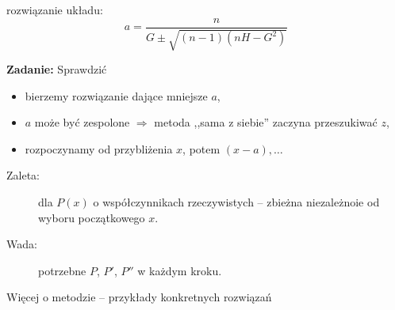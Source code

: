 \begin{frame}
  rozwiązanie układu: $$a = \frac{n}{G \pm \sqrt{(n-1)(nH-G^2)}}$$

  \textbf{Zadanie:} Sprawdzić

  \begin{itemize}
    \item bierzemy rozwiązanie dające mniejsze $a$,
    \item $a$ może być zespolone $\Rightarrow$ metoda ,,sama z siebie'' zaczyna przeszukiwać $z$, %
    \item rozpoczynamy od przybliżenia $x$, potem $(x-a),\dots $
  \end{itemize}
\end{frame}

\begin{frame}
  \begin{description}
    \item[Zaleta:] dla $P(x)$ o współczynnikach rzeczywistych -- zbieżna niezależnoie od wyboru początkowego $x$.
    \item[Wada:] potrzebne $P$, $P'$, $P''$ w każdym kroku.
  \end{description}

  Więcej o metodzie -- przykłady konkretnych rozwiązań \cite{Adams}
\end{frame}
